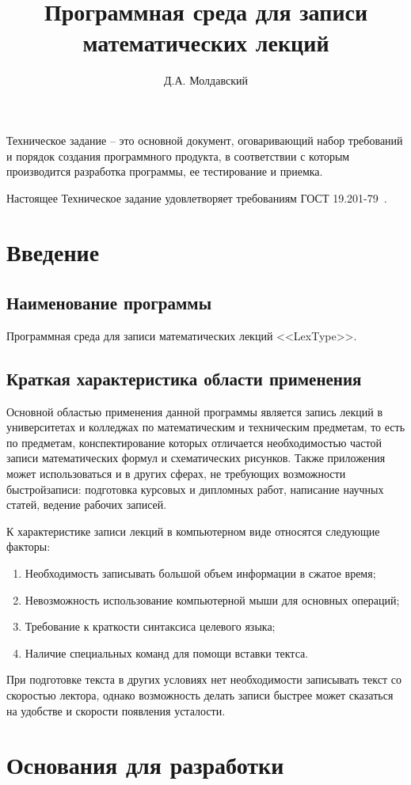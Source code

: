 \documentclass[techtask]{espd}
\author{Д.А. Молдавский}
\title{Программная среда для записи\\математических лекций}
\begin{document}
\annotation
Техническое задание -- это основной документ, оговаривающий набор требований и порядок создания программного продукта, в соответствии с которым производится разработка программы, ее тестирование и приемка.

Настоящее Техническое задание удовлетворяет требованиям ГОСТ 19.201-79~\cite{espd201}.

\tableofcontents

\section{Введение}
\subsection{Наименование программы}
Программная среда для записи математических лекций <<LexType>>.

\subsection{Краткая характеристика области применения}
Основной областью применения данной программы является запись лекций в университетах и колледжах по математическим и техническим предметам, то есть по предметам, конспектирование которых отличается необходимостью частой записи математических формул и схематических рисунков. Также приложения может использоваться и в других сферах, не требующих возможности быстройзаписи: подготовка курсовых и дипломных работ, написание научных статей, ведение рабочих записей.

К характеристике записи лекций в компьютерном виде относятся следующие факторы:

\begin{enumerate}
\item Необходимость записывать большой объем информации в сжатое время;
\item Невозможность использование компьютерной мыши для основных операций;
\item Требование к краткости синтаксиса целевого языка;
\item Наличие специальных команд для помощи вставки тектса.
\end{enumerate}

При подготовке текста в других условиях нет необходимости записывать текст со скоростью лектора, однако возможность делать записи быстрее может сказаться на удобстве и скорости появления усталости.

\section{Основания для разработки}
\end{document}
